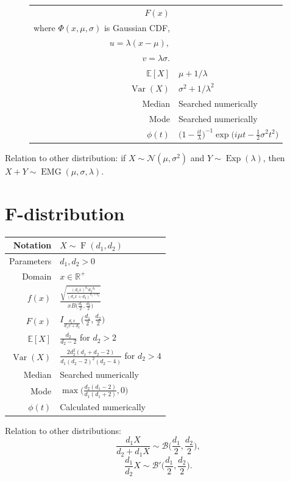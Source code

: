 \documentclass[a4paper,11pt]{article}
\theoremstyle{plain}
\theoremstyle{definition}
\newcommand{\ME}{\mathbb{E}}
\newcommand{\MR}{\mathbb{R}}
\newcommand{\Var}{\operatorname{Var}}
\begin{document}
\begin{figure}[!htb]
\begin{minipage}{0.4\textwidth}
\begin{tabular}{| r | l |}
			\hline
			$F(x)$ &\pbox{\linewidth}{$ \Phi(u,0,v)-e^{ -u + \frac{v^2}{2} +\log \Phi(u, v^2, v) }, $\\ where  $\Phi(x, \mu, \sigma)$ is Gaussian CDF, \\ $u=\lambda(x-\mu),$ \\ $v=\lambda \sigma$. } \\
			\hline
			$\ME[X]$ & $ \mu + 1 / \lambda$ \\
			\hline
			$\Var(X)$ & $\sigma^2 + 1/\lambda^2$ \\
			\hline
			Median & Searched numerically \\
			\hline
			Mode & Searched numerically \\
			\hline
			$\phi(t)$ & $ \big(1-\frac{it}{\lambda} \big)^{-1}  \exp \big(i\mu t - \frac{1}{2} \sigma^2 t^2 \big) $ \\
			\hline
		\end{tabular}
	\end{minipage}
\end{figure}
    Relation to other distribution: if $X \sim \mathcal{N}(\mu, \sigma^2)$ and $Y \sim \operatorname{Exp}(\lambda)$, then $X + Y \sim \operatorname{EMG}(\mu, \sigma, \lambda)$.
	
	
	\pagebreak
	\section{F-distribution}
		\begin{center}
			\begin{tabular}{| r | l |}
				\hline
				Notation & $X \sim \operatorname{F}(d_1, d_2)$ \\
				\hline
				Parameters & $d_1, d_2 > 0$ \\
				\hline
				Domain & $x \in \MR^+$  \\
				\hline
				$f(x)$ & $\frac{\sqrt{\frac{(d_1 x)^{d_1} {d_2}^{d_2} }{(d_1x+d_2)^{d_1+d_2}}}}{x B\Big(\frac{d_1}{2},\frac{d_2}{2}\Big)}  $ \\
				\hline
				$F(x)$ & $ I_{\frac{d_1x}{d_1x+d_2}}\Big(\frac{d_1}{2},\frac{d_2}{2}\Big) $\\
				\hline
				$\ME[X]$ & $ \frac{d_2}{d_2-2}$ for $ d_2 > 2 $ \\
				\hline
				$\Var(X)$ & $\frac{2d_2^2(d_1+d_2-2)}{d_1(d_2-2)^2(d_2-4)}$ for $d_2 > 4$ \\
				\hline
				Median & Searched numerically \\
				\hline
				Mode & $\max\Big(\frac{d_2(d_1-2)}{d_1(d_1+2)}, 0\Big)$ \\
				\hline
				$\phi(t)$ & Calculated numerically \\
				\hline
			\end{tabular}
		\end{center}
		Relation to other distributions:
		\[
		\frac{d_1X}{d_2 + d_1X} \sim \mathcal{B}\bigg(\frac{d_1}{2}, \frac{d_2}{2} \bigg),
		\]
		\[
		\frac{d_1}{d_2}X \sim \mathcal{B}'\bigg(\frac{d_1}{2}, \frac{d_2}{2} \bigg).
		\]
		
\end{document}
